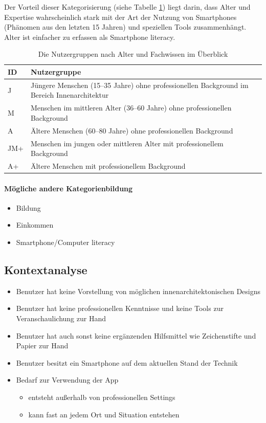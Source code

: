 \documentclass[12pt,paper=a4,oneside,hidelinks,headings=small,captions=heading,captions=nooneline]{scrartcl}
\begin{document}
Der Vorteil dieser Kategorisierung (siehe Tabelle \ref{tbl:usergroups})
liegt darin, dass Alter und Expertise wahrscheinlich stark mit der Art
der Nutzung von Smartphones (Phänomen aus den letzten 15 Jahren) und
speziellen Tools zusammenhängt. Alter ist einfacher zu erfassen als
Smartphone literacy.

\begin{table}[htbp]
\caption{\label{tbl:usergroups}Die Nutzergruppen nach Alter und Fachwissen im Überblick}
\centering
\begin{tabular}{ll}
\toprule
ID & Nutzergruppe\\
\midrule
J & Jüngere Menschen (15--35 Jahre) ohne professionellen Background im Bereich Innenarchitektur\\
M & Menschen im mittleren Alter (36--60 Jahre) ohne professionellen Background\\
A & Ältere Menschen (60--80 Jahre) ohne professionellen Background\\
JM+ & Menschen im jungen oder mittleren Alter mit professionellem Background\\
A+ & Ältere Menschen mit professionellem Background\\
\bottomrule
\end{tabular}
\end{table}

\paragraph{Mögliche andere Kategorienbildung}
\label{sec:org48ea9c1}
\begin{itemize}
\item Bildung
\item Einkommen
\item Smartphone/Computer literacy
\end{itemize}

\subsection{Kontextanalyse}
\label{sec:orgb6062df}

\begin{itemize}
\item Benutzer hat keine Vorstellung von möglichen innenarchitektonischen
Designs
\item Benutzer hat keine professionellen Kenntnisse und keine Tools zur
Veranschaulichung zur Hand
\item Benutzer hat auch sonst keine ergänzenden Hilfsmittel wie
Zeichenstifte und Papier zur Hand
\item Benutzer besitzt ein Smartphone auf dem aktuellen Stand der Technik
\item Bedarf zur Verwendung der App
\begin{itemize}
\item entsteht außerhalb von professionellen Settings
\item kann fast an jedem Ort und Situation entstehen
\end{itemize}
\end{itemize}
\end{document}
